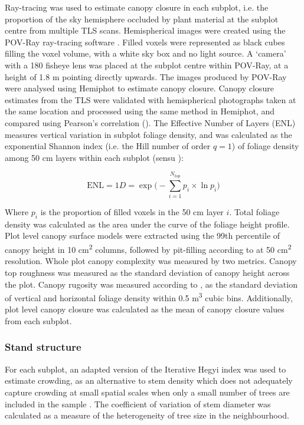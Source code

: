 \documentclass[11pt,a4paper]{article}
\begin{document}
Ray-tracing was used to estimate canopy closure in each subplot, i.e. the proportion of the sky hemisphere occluded by plant material at the subplot centre from multiple TLS scans. Hemispherical images were created using the POV-Ray ray-tracing software \citep{Povray2004}. Filled voxels were represented as black cubes filling the voxel volume, with a white sky box and no light source. A `camera' with a 180\textdegree{} fisheye lens was placed at the subplot centre within POV-Ray, at a height of 1.8 m pointing directly upwards. The images produced by POV-Ray were analysed using Hemiphot \citep{HemiPhot} to estimate canopy closure. Canopy closure estimates from the TLS were validated with hemispherical photographs taken at the same location and processed using the same method in Hemiphot, and compared using Pearson's correlation (\hemiCor{}). The Effective Number of Layers (ENL) measures vertical variation in subplot foliage density, and was calculated as the exponential Shannon index (i.e. the Hill number of order $q=1$) of foliage density among 50 cm layers within each subplot (sensu \citealt{Ehbrecht2016}):

\begin{equation}
	\text{ENL} = 1D = \exp\Big(-\sum_{i=1}^{N_{top}} p_{i} \times \ln p_{i} \Big)
\end{equation}

Where $p_{i}$ is the proportion of filled voxels in the 50 cm layer $i$. Total foliage density was calculated as the area under the curve of the foliage height profile. Plot level canopy surface models were extracted using the 99th percentile of canopy height in 10 cm\textsuperscript{2} columns, followed by pit-filling according to \citet{Khosravipour2014} at 50 cm\textsuperscript{2} resolution. Whole plot canopy complexity was measured by two metrics. Canopy top roughness was measured as the standard deviation of canopy height across the plot. Canopy rugosity was measured according to \citet{Hardiman2011}, as the standard deviation of vertical and horizontal foliage density within 0.5 m\textsuperscript{3} cubic bins. Additionally, plot level canopy closure was calculated as the mean of canopy closure values from each subplot.

\subsubsection{Stand structure}

For each subplot, an adapted version of the Iterative Hegyi index was used to estimate crowding, as an alternative to stem density which does not adequately capture crowding at small spatial scales when only a small number of trees are included in the sample \citep{Hegyi1974}. The coefficient of variation of stem diameter was calculated as a measure of the heterogeneity of tree size in the neighbourhood. 
\end{document}
